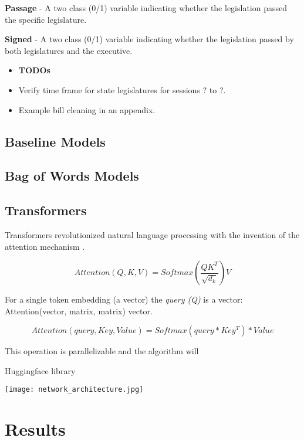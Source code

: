 \documentclass[11pt]{article}
\begin{document}
\textbf{Passage} - A two class (0/1) variable indicating whether the legislation passed the specific legislature. 

\textbf{Signed} - A two class (0/1) variable indicating whether the legislation passed by both legislatures and the executive.


\begin{itemize}
  \item \textbf{TODOs}
  \item Verify time frame for state legislatures for sessions ? to ?.
  \item Example bill cleaning in an appendix.

\end{itemize}

\subsection{Baseline Models}

\subsection{Bag of Words Models}

\subsection{Transformers}

Transformers revolutionized natural language processing with the invention of the attention mechanism \cite{DBLP:journals/corr/VaswaniSPUJGKP17}.

$$ Attention(Q,K,V) = Softmax(\frac{QK^T}{\sqrt{d_k}})V $$

For a single token embedding (a vector) the \textit{query (Q)} is a vector: Attention(vector, matrix, matrix) \rightarrow vector.

$$Attention(query, Key, Value) = Softmax(query * Key^T) * Value$$

This operation is parallelizable and the algorithm will 



Huggingface library \cite{DBLP:journals/corr/abs-1910-03771}

\texttt{[image: network\_architecture.jpg]}

\section{Results}
\end{document}

